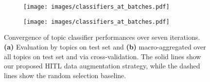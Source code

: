 
\begin{figure}[!tbp]
	\centering
	\begin{subfigure}{0.49\textwidth}
		\texttt{[image: images/classifiers\_at\_batches.pdf]}
		\caption{}
	\end{subfigure}
	\begin{subfigure}{0.49\textwidth}
		\texttt{[image: images/classifiers\_at\_batches.pdf]}
		\caption{}
		\label{subfig:macro_classifier_convergence}
	\end{subfigure}
	\caption{
        Convergence of topic classifier performances over seven iterations.
		\textbf{(a)} Evaluation by topics on test set and \textbf{(b)} macro-aggregated over all topics on test set and via cross-validation.
		The solid lines show our proposed HITL data augmentation strategy, while the dashed lines show the random selection baseline.
	}
	\label{fig:classifier_convergence}
\end{figure}
